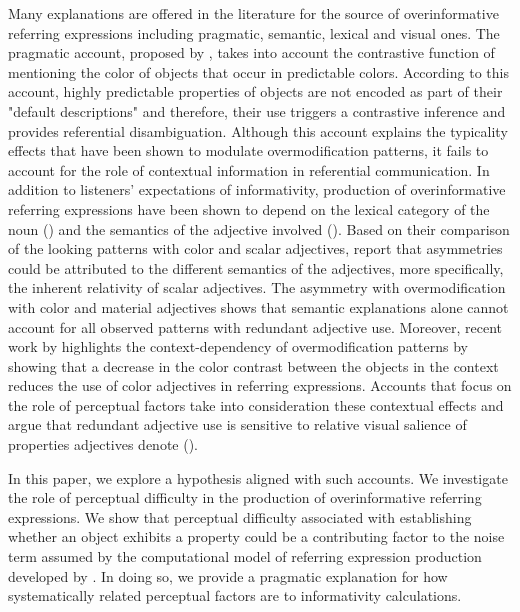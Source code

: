 \documentclass[12pt,letterpaper]{article}
\begin{document}
Many explanations are offered in the literature for the source of overinformative referring expressions including pragmatic, semantic, lexical and visual ones. The pragmatic account, proposed by \citet{Sedivy2003}, takes into account the contrastive function of mentioning the color of objects that occur in predictable colors. According to this account, highly predictable properties of objects are not encoded as part of their "default descriptions" and therefore, their use triggers a contrastive inference and provides referential disambiguation. Although this account explains the typicality effects that have been shown to modulate overmodification patterns, it fails to account for the role of contextual information in referential communication. In addition to listeners' expectations of informativity, production of overinformative referring expressions have been shown to depend on the lexical category of the noun (\citealt{RubioFernandez2016}) and the semantics of the adjective involved (\citealt{RubioEtAl2019, Sedivy2003}). Based on their comparison of the looking patterns with color and scalar adjectives, \citet{AparicioEtAl2018} report that asymmetries could be attributed to the different semantics of the adjectives, more specifically, the inherent relativity of scalar adjectives. The asymmetry with overmodification with color and material adjectives shows that semantic explanations alone cannot account for all observed patterns with redundant adjective use. Moreover, recent work by \citet{ViethenEtAl2017} highlights the context-dependency of overmodification patterns by showing that a decrease in the color contrast between the objects in the context reduces the use of color adjectives in referring expressions. Accounts that focus on the role of perceptual factors take into consideration these contextual effects and argue that redundant adjective use is sensitive to relative visual salience of properties adjectives denote (\citealt{RubioEtAl2019, Taranskeen2015}). 

In this paper, we explore a hypothesis aligned with such accounts. We investigate the role of perceptual difficulty in the production of overinformative referring expressions. We show that perceptual difficulty associated with establishing whether an object exhibits a property could be a contributing factor to the noise term assumed by the computational model of referring expression production developed by \citet{DegenEtAl2020}. In doing so, we provide a pragmatic explanation for how systematically related perceptual factors are to informativity calculations.
\end{document}
